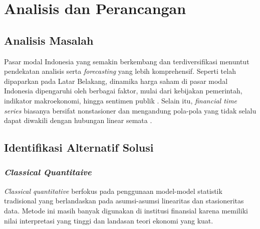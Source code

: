 \chapter{Analisis dan Perancangan}

\section{Analisis Masalah}
Pasar modal Indonesia yang semakin berkembang dan terdiversifikasi menuntut pendekatan analisis serta \textit{forecasting} yang lebih komprehensif. Seperti telah dipaparkan pada Latar Belakang, dinamika harga saham di pasar modal Indonesia dipengaruhi oleh berbagai faktor, mulai dari kebijakan pemerintah, indikator makroekonomi, hingga sentimen publik \parencite{FekrazadEtAl2022}. Selain itu, \textit{financial time series} biasanya bersifat nonstasioner dan mengandung pola-pola yang tidak selalu dapat diwakili dengan hubungan linear semata \parencite{Goodfellow-et-al-2016}. 

\section{Identifikasi Alternatif Solusi}
\subsection{\textit{Classical Quantitaive}}
\textit{Classical quantitative} berfokus pada penggunaan model-model statistik tradisional yang berlandaskan pada asumsi-asumsi linearitas dan stasioneritas data.  Metode ini masih banyak digunakan di institusi finansial karena memiliki nilai interpretasi yang tinggi dan landasan teori ekonomi yang kuat.

